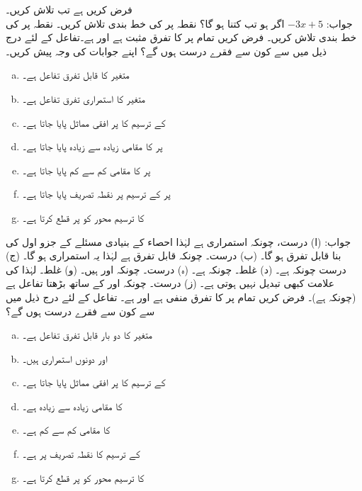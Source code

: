 فرض کریں  ہے تب  تلاش کریں۔\\
جواب:\quad
$-3x+5$
اگر  ہو تب  کتنا ہو گا؟
نقطہ  پر  کی خط بندی تلاش کریں۔
نقطہ  پر  کی خط بندی تلاش کریں۔
فرض کریں تمام  پر  کا تفرق مثبت ہے اور  ہے۔تفاعل  کے لئے درج ذیل میں سے کون سے فقرے درست ہوں گے؟ اپنے جوابات کی وجہ پیش کریں۔
\begin{enumerate}[a.]
\item
{} متغیر  کا قابل تفرق تفاعل ہے۔
\item
{} متغیر  کا استمراری تفرق تفاعل ہے۔
\item
{} کے ترسیم کا  پر افقی مماثل پایا جاتا ہے۔
\item
{} پر  کا مقامی زیادہ سے زیادہ پایا جاتا ہے۔
\item
{} پر  کا مقامی کم سے کم پایا جاتا ہے۔
\item
{} پر  کے ترسیم پر نقطہ تصریف پایا جاتا ہے۔
\item
{} کا ترسیم  محور کو  پر قطع کرتا ہے۔
\end{enumerate}
جواب:\quad
(ا) درست، چونکہ  استمراری ہے لہٰذا احصاء کے بنیادی مسئلے کے جزو اول کی بنا  قابل تفرق ہو گا۔ (ب) درست۔ چونکہ  قابل تفرق ہے لہٰذا یہ استمراری ہو گا۔ (ج) درست چونکہ  ہے۔ (د) غلط۔ چونکہ  ہے۔ (ہ) درست۔ چونکہ  اور  ہیں۔ (و) غلط۔  لہٰذا  کی علامت کبھی تبدیل نہیں ہوتی ہے۔ (ز) درست۔ چونکہ  اور  کے ساتھ  بڑھتا تفاعل ہے (چونکہ  ہے)۔ 
فرض کریں تمام  پر  کا تفرق منفی ہے اور  ہے۔ تفاعل  کے لئے درج ذیل میں سے کون سے فقرے درست ہوں گے؟
\begin{enumerate}[a.]
\item
{} متغیر  کا دو بار قابل تفرق تفاعل ہے۔
\item
{} اور  دونوں استمراری ہیں۔
\item
{} کے ترسیم کا  پر افقی مماثل پایا جاتا ہے۔
\item
{} کا مقامی زیادہ سے زیادہ  ہے۔
\item
{} کا مقامی کم سے کم  ہے۔
\item
{} کے ترسیم کا نقطہ تصریف  پر ہے۔
\item
{} کا ترسیم  محور کو  پر قطع کرتا ہے۔
\end{enumerate}
